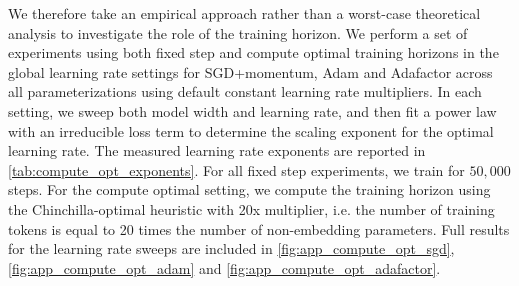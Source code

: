 \documentclass{article}
\theoremstyle{plain}
\theoremstyle{definition}
\theoremstyle{remark}
\begin{document}
We therefore take an empirical approach rather than a worst-case theoretical analysis to investigate the role of the training horizon. We perform a set of experiments using both fixed step and compute optimal training horizons in the global learning rate settings for SGD+momentum, Adam and Adafactor across all parameterizations using default constant learning rate multipliers. In each setting, we sweep both model width and learning rate, and then fit a power law with an irreducible loss term to determine the scaling exponent for the optimal learning rate. The measured learning rate exponents are reported in \cref{tab:compute_opt_exponents}. For all fixed step experiments, we train for $50{,}000$ steps. For the compute optimal setting, we compute the training horizon using the Chinchilla-optimal heuristic \citep{hoffmann2022training} with 20x multiplier, i.e. the number of training tokens is equal to 20 times the number of non-embedding parameters. Full results for the learning rate sweeps are included in \cref{fig:app_compute_opt_sgd}, \ref{fig:app_compute_opt_adam} and \ref{fig:app_compute_opt_adafactor}.
\end{document}
